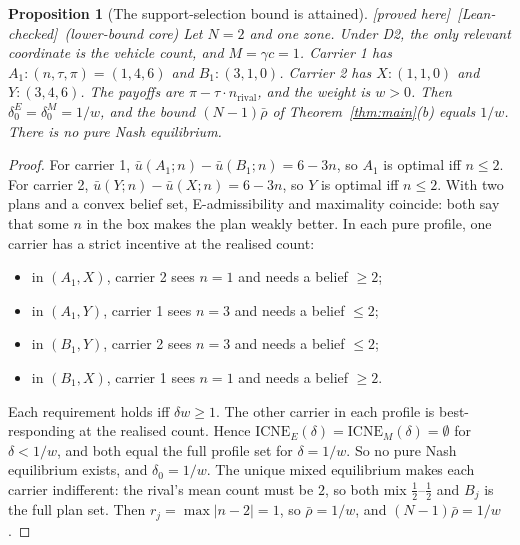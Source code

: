 \documentclass[11pt]{article}
\newtheorem{proposition}[theorem]{Proposition}
\theoremstyle{definition}
\theoremstyle{remark}
\newcommand{\ub}{\bar u}
\newcommand{\ICNE}{\mathrm{ICNE}}
\newcommand{\PROVED}{\textsf{[proved here]}}
\newcommand{\LEAN}{\textsf{[Lean-checked]}}
\begin{document}
\begin{proposition}[The support-selection bound is attained]\label{prop:tight} \PROVED\ \LEAN\ (lower-bound core)
Let $N=2$ and one zone. Under D2, the only relevant coordinate is the vehicle count, and $M=\gamma c=1$. Carrier 1 has $A_1:(n,\tau,\pi)=(1,4,6)$ and $B_1:(3,1,0)$. Carrier 2 has $X:(1,1,0)$ and $Y:(3,4,6)$. The payoffs are $\pi-\tau\cdot n_{\text{rival}}$, and the weight is $w>0$. Then $\delta_0^E=\delta_0^M=1/w$, and the bound $(N-1)\bar\rho$ of Theorem~\ref{thm:main}(b) equals $1/w$. There is no pure Nash equilibrium.
\end{proposition}
\begin{proof}
For carrier 1, $\ub(A_1;n)-\ub(B_1;n)=6-3n$, so $A_1$ is optimal iff $n\le2$. For carrier 2, $\ub(Y;n)-\ub(X;n)=6-3n$, so $Y$ is optimal iff $n\le2$. With two plans and a convex belief set, E-admissibility and maximality coincide: both say that some $n$ in the box makes the plan weakly better. In each pure profile, one carrier has a strict incentive at the realised count:
\begin{itemize}
\item in $(A_1,X)$, carrier 2 sees $n=1$ and needs a belief $\ge2$;
\item in $(A_1,Y)$, carrier 1 sees $n=3$ and needs a belief $\le2$;
\item in $(B_1,Y)$, carrier 2 sees $n=3$ and needs a belief $\le2$;
\item in $(B_1,X)$, carrier 1 sees $n=1$ and needs a belief $\ge2$.
\end{itemize}
Each requirement holds iff $\delta w\ge1$. The other carrier in each profile is best-responding at the realised count. Hence $\ICNE_E(\delta)=\ICNE_M(\delta)=\emptyset$ for $\delta<1/w$, and both equal the full profile set for $\delta=1/w$. So no pure Nash equilibrium exists, and $\delta_0=1/w$. The unique mixed equilibrium makes each carrier indifferent: the rival's mean count must be $2$, so both mix $\tfrac12$--$\tfrac12$ and $B_j$ is the full plan set. Then $r_j=\max|n-2|=1$, so $\bar\rho=1/w$, and $(N-1)\bar\rho=1/w$.
\end{proof}
\end{document}
